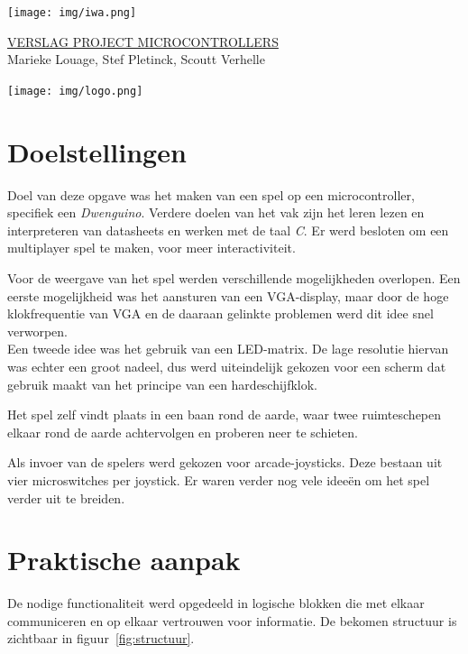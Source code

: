 \documentclass[a4paper, 12pt]{article}
\begin{document}
\begin{titlepage}
  \setul{}{2pt} %
  \texttt{[image: img/iwa.png]}
  \vspace{2cm} \vfill

  \textcolor{ublauw}{\ptitle \uppercase{\ul{Verslag project microcontrollers}}}\\[1em]
  \Large{\panno Marieke Louage, Stef Pletinck, Scoutt Verhelle}
  \vfill

  \texttt{[image: img/logo.png]}

\end{titlepage}

\tableofcontents
\listoftodos
\newpage

\section{Doelstellingen}
Doel van deze opgave was het maken van een spel op een microcontroller,
specifiek een \emph{Dwenguino}.
Verdere doelen van het vak zijn het leren lezen en interpreteren van datasheets
en werken met de taal \emph{C}.
Er werd besloten om een multiplayer spel te maken,
voor meer interactiviteit.

Voor de weergave van het spel werden verschillende mogelijkheden overlopen.
Een eerste mogelijkheid was het aansturen van een VGA-display,
maar door de hoge klokfrequentie van VGA en de daaraan gelinkte problemen
werd dit idee snel verworpen.\\
Een tweede idee was het gebruik van een LED-matrix.
De lage resolutie hiervan was echter een groot nadeel,
dus werd uiteindelijk gekozen voor een scherm dat gebruik maakt
van het principe van een hardeschijfklok.

Het spel zelf vindt plaats in een baan rond de aarde, waar twee ruimteschepen
elkaar rond de aarde achtervolgen en proberen neer te schieten.

Als invoer van de spelers werd gekozen voor arcade-joysticks.
Deze bestaan uit vier microswitches per joystick.
Er waren verder nog vele ideeën om het spel verder uit te breiden.

\section{Praktische aanpak}
De nodige functionaliteit werd opgedeeld in logische blokken die met elkaar
communiceren en op elkaar vertrouwen voor informatie. De bekomen structuur is
zichtbaar in figuur~\ref{fig:structuur}.
\end{document}
